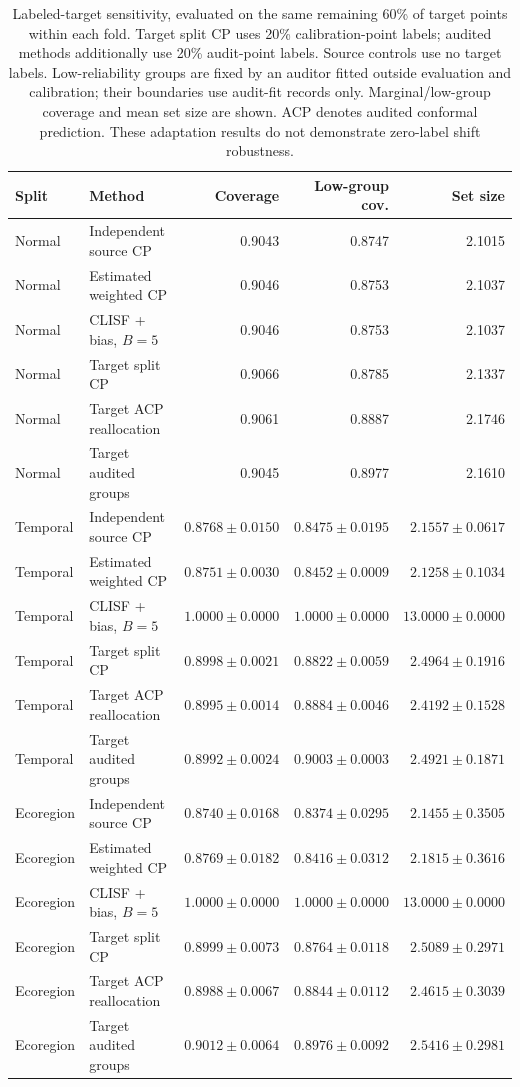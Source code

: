 \begin{table}[htbp]
\centering\scriptsize
\setlength{\tabcolsep}{2.3pt}
\caption{Labeled-target sensitivity, evaluated on the same remaining 60\% of target points within each fold. Target split CP uses 20\% calibration-point labels; audited methods additionally use 20\% audit-point labels. Source controls use no target labels. Low-reliability groups are fixed by an auditor fitted outside evaluation and calibration; their boundaries use audit-fit records only. Marginal/low-group coverage and mean set size are shown. ACP denotes audited conformal prediction. These adaptation results do not demonstrate zero-label shift robustness.}\label{tab:supp-target-audit}
\begin{tabular}{llrrr}
\toprule
Split & Method & Coverage & Low-group cov. & Set size \\
\midrule
Normal & Independent source CP & 0.9043 & 0.8747 & 2.1015 \\
Normal & Estimated weighted CP & 0.9046 & 0.8753 & 2.1037 \\
Normal & CLISF + bias, $B=5$ & 0.9046 & 0.8753 & 2.1037 \\
Normal & Target split CP & 0.9066 & 0.8785 & 2.1337 \\
Normal & Target ACP reallocation & 0.9061 & 0.8887 & 2.1746 \\
Normal & Target audited groups & 0.9045 & 0.8977 & 2.1610 \\
Temporal & Independent source CP & $0.8768\pm0.0150$ & $0.8475\pm0.0195$ & $2.1557\pm0.0617$ \\
Temporal & Estimated weighted CP & $0.8751\pm0.0030$ & $0.8452\pm0.0009$ & $2.1258\pm0.1034$ \\
Temporal & CLISF + bias, $B=5$ & $1.0000\pm0.0000$ & $1.0000\pm0.0000$ & $13.0000\pm0.0000$ \\
Temporal & Target split CP & $0.8998\pm0.0021$ & $0.8822\pm0.0059$ & $2.4964\pm0.1916$ \\
Temporal & Target ACP reallocation & $0.8995\pm0.0014$ & $0.8884\pm0.0046$ & $2.4192\pm0.1528$ \\
Temporal & Target audited groups & $0.8992\pm0.0024$ & $0.9003\pm0.0003$ & $2.4921\pm0.1871$ \\
Ecoregion & Independent source CP & $0.8740\pm0.0168$ & $0.8374\pm0.0295$ & $2.1455\pm0.3505$ \\
Ecoregion & Estimated weighted CP & $0.8769\pm0.0182$ & $0.8416\pm0.0312$ & $2.1815\pm0.3616$ \\
Ecoregion & CLISF + bias, $B=5$ & $1.0000\pm0.0000$ & $1.0000\pm0.0000$ & $13.0000\pm0.0000$ \\
Ecoregion & Target split CP & $0.8999\pm0.0073$ & $0.8764\pm0.0118$ & $2.5089\pm0.2971$ \\
Ecoregion & Target ACP reallocation & $0.8988\pm0.0067$ & $0.8844\pm0.0112$ & $2.4615\pm0.3039$ \\
Ecoregion & Target audited groups & $0.9012\pm0.0064$ & $0.8976\pm0.0092$ & $2.5416\pm0.2981$ \\
\bottomrule
\end{tabular}
\end{table}
